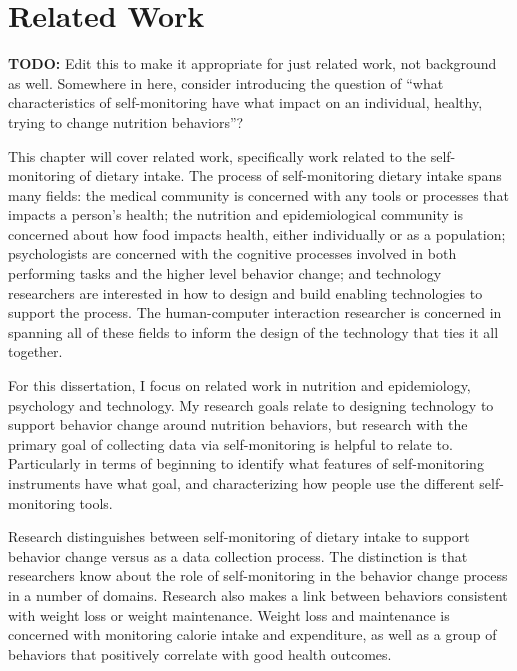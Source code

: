 \chapter{Related Work}
\label{cha:relatedWork}

\textbf{TODO: }Edit this to make it appropriate for just related work, not background as well. Somewhere in here, consider introducing the question of ``what characteristics of self-monitoring have what impact on an individual, healthy, trying to change nutrition behaviors''? 

This chapter will cover related work, specifically work related to the self-monitoring of dietary intake. The process of self-monitoring dietary intake spans many fields: the medical community is concerned with any tools or processes that impacts a person's health; the nutrition and epidemiological community is concerned about how food impacts health, either individually or as a population; psychologists are concerned with the cognitive processes involved in both performing tasks and the higher level behavior change; and technology researchers are interested in how to design and build enabling technologies to support the process. The human-computer interaction researcher is concerned in spanning all of these fields to inform the design of the technology that ties it all together. 


For this dissertation, I focus on related work in nutrition and epidemiology, psychology and technology. My research goals relate to designing technology to support behavior change around nutrition behaviors, but research with the primary goal of collecting data via self-monitoring is helpful to relate to. Particularly in terms of beginning to identify what features of self-monitoring instruments have what goal, and characterizing how people use the different self-monitoring tools. 

Research distinguishes between self-monitoring of dietary intake to support behavior change versus as a data collection process. The distinction is that researchers know about the role of self-monitoring in the behavior change process in a number of domains. Research also makes a link between behaviors consistent with weight loss or weight maintenance. Weight loss and maintenance is concerned with monitoring calorie intake and expenditure, as well as a group of behaviors that positively correlate with good health outcomes. 

